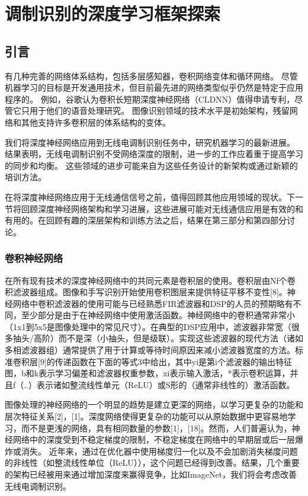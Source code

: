 \chapter{调制识别的深度学习框架探索}
\section{引言}
有几种完善的网络体系结构，包括多层感知器，卷积网络变体和循环网络。 尽管机器学习的目标是开发通用技术，但目前最先进的网络类型似乎仍然是特定于应用程序的。 例如，谷歌认为卷积长短期深度神经网络（CLDNN）值得申请专利，尽管它只用于他们的语音处理研究。 图像识别领域的技术水平是初始架构，残留网络和其他支持许多卷积层的体系结构的变体。\par

我们将深度神经网络应用到无线电调制识别任务中，研究机器学习的最新进展。 结果表明，无线电调制识别不受网络深度的限制，进一步的工作应着重于提高学习的同步和均衡。 这些领域的进步可能来自为这些任务设计的新架构或通过新颖的培训方法。\par

在将深度神经网络应用于无线通信信号之前，值得回顾其他应用领域的现状。下一节将回顾深度神经网络架构和学习进展，这些进展可能对无线通信应用是有效的和有用的。在回顾有趣的深层架构和训练方法之后，结果在第三部分和第四部分讨论。 \par

\subsection{卷积神经网络}
在所有现有技术的深度神经网络中的共同元素是卷积层的使用。卷积层由Nf个卷积滤波器组成。图像和手写识别开始使用卷积图层来提供特征平移不变性[8]。神经网络中卷积滤波器的使用可能与已经熟悉FIR滤波器和DSP的人员的预期略有不同，至少部分是由于在神经网络中使用激活函数。神经网络中的卷积通常非常小（1x1到5x5是图像处理中的常见尺寸）。在典型的DSP应用中，滤波器非常宽（很多抽头/高阶）而不是深（小抽头，但是级联）。实现这些滤波器的现代方法（诸如多相滤波器组）通常提供了用于计算或等待时间原因来减小滤波器宽度的方法。标准卷积层[9]的传递函数在下面的等式3中给出，其中yi是第i个滤波器的输出特征图，b和k表示学习偏差和滤波器权重参数，xi表示输入激活，*表示卷积运算，并且f（..）表示诸如整流线性单元（ReLU）或S形的（通常非线性的）激活函数。\par

图像处理的神经网络的一个明显的趋势是建立更深的网络，以学习更复杂的功能和层次特征关系[2]，[1]。深度网络使得更复杂的功能可以从原始数据中更容易地学习，而不是更浅的网络，具有相同数量的参数[1]，[18]。然而，人们普遍认为，神经网络中的深度受到不稳定梯度的限制，不稳定梯度在网络中的早期层或后一层爆炸或消失。
近年来，通过在优化器中使用梯度归一化以及不会加剧消失梯度问题的非线性（如整流线性单位（ReLU）），这个问题已经得到改善。结果，几个重要的架构已经被用来通过增加深度来赢得竞争，比如ImageNet，我们将会考虑改善无线电调制识别。\par

